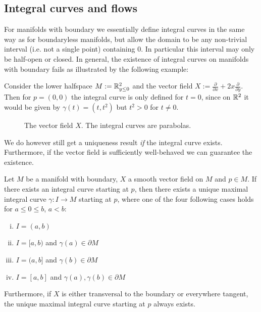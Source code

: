 
\subsection{Integral curves and flows}

For manifolds with boundary we essentially define integral curves in the same way as for boundaryless manifolds, but allow the domain to be any non-trivial interval (i.e. not a single point) containing $0$. In particular this interval may only be half-open or closed. In general, the existence of integral curves on manifolds with boundary fails as illustrated by the following example:

\begin{counterexample}
    \label{rem:vector_field_example}
    Consider  the lower halfspace $M := \mathbb{R}^2_{y \leq 0}$ and the vector field $X := \frac{\partial}{\partial x} + 2x \frac{\partial}{\partial y}$. Then for $p = (0,0)$ the integral curve is only defined for $t = 0$, since on $\mathbb{R}^2$ it would be given by $\gamma(t) = (t,t^2)$ but $t^2 > 0$ for $t \neq 0$.
    \begin{figure}[ht]
        \centering
        \label{fig:vector_field1}
        
        \caption{The vector field $X$. The integral curves are parabolas.}
    \end{figure}
\end{counterexample}

We do however still get a uniqueness result \textit{if} the integral curve exists. Furthermore, if the vector field is sufficiently well-behaved we can guarantee the existence.

\begin{theorem}
    \label{lem:existence_integral_curves}
    Let $M$ be a manifold with boundary, $X$ a smooth vector field on $M$ and $p \in M$. If there exists an integral curve starting at $p$, then there exists a unique maximal integral curve $\gamma \colon I \to M$ starting at $p$, where one of the four following cases holds for $a \leq 0 \leq b$, $a<b$:
    \begin{enumerate}[(i)]
        \item $I = (a,b)$
        \item $I = [a,b)$ and $\gamma(a) \in \partial M$
        \item $I = (a,b]$ and $\gamma(b) \in \partial M$
        \item $I = [a,b]$ and $\gamma(a),\gamma(b) \in \partial M$
    \end{enumerate}
    Furthermore, if $X$ is either transversal to the boundary or everywhere tangent, the unique maximal integral curve starting at $p$ always exists.
\end{theorem}


